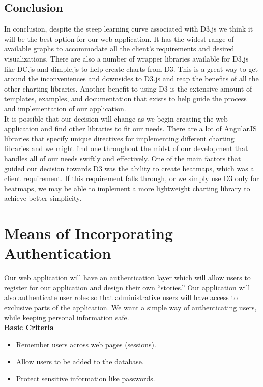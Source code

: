 \documentclass[onecolumn, draftclsnofoot,10pt, compsoc]{IEEEtran}
\begin{document}
\subsection{Conclusion}
In conclusion, despite the steep learning curve associated with D3.js we think it will be the best option for our web application. It has the widest range of available graphs to accommodate all the client's requirements and desired visualizations. There are also a number of wrapper libraries available for D3.js like DC.js and dimple.js to help create charts from D3. This is a great way to get around the inconveniences and downsides to D3.js and reap the benefits of all the other charting libraries. Another benefit to using D3 is the extensive amount of templates, examples, and documentation that exists to help guide the process and implementation of our application.\\
It is possible that our decision will change as we begin creating the web application and find other libraries to fit our needs. There are a lot of AngularJS libraries that specify unique directives for implementing different charting libraries and we might find one throughout the midst of our development that handles all of our needs swiftly and effectively. One of the main factors that guided our decision towards D3 was the ability to create heatmaps, which was a client requirement. If this requirement falls through, or we simply use D3 only for heatmaps, we may be able to implement a more lightweight charting library to achieve better simplicity.
\section{Means of Incorporating Authentication}
Our web application will have an authentication layer which will allow users to register for our application and design their own ``stories.'' Our application will also authenticate user roles so that administrative users will have access to exclusive parts of the application. We want a simple way of authenticating users, while keeping personal information safe.\\
\textbf{Basic Criteria}
\begin{itemize}
\item Remember users across web pages (sessions). 
\item Allow users to be added to the database. 
\item Protect sensitive information like passwords.
\end{itemize}
\end{document}
